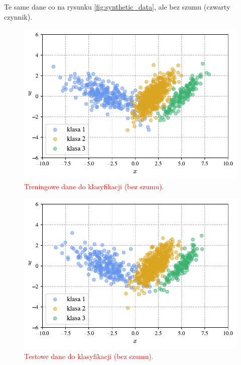 \documentclass[12pt,a4paper,oneside]{book}
\theoremstyle{definition}
\begin{document}
Te same dane co na rysunku \ref{fig:synthetic_data}, ale bez szumu (czwarty czynnik).

\begin{figure}[H]
    \centering
    \includegraphics[scale=0.7]{synthetic_train_data_classification}
    \vspace{-0.5cm} 
    \caption{\textcolor{red}{Treningowe dane do klasyfikacji (bez szumu).}}
    \label{fig:synthetic_train_data_classification}
\end{figure}

\begin{figure}[H]
    \centering
    \includegraphics[scale=0.7]{synthetic_test_data_classification}
    \vspace{-0.5cm} 
    \caption{\textcolor{red}{Testowe dane do klasyfikacji (bez szumu).}}
    \label{fig:synthetic_test_data_classification}
\end{figure}
\end{document}
